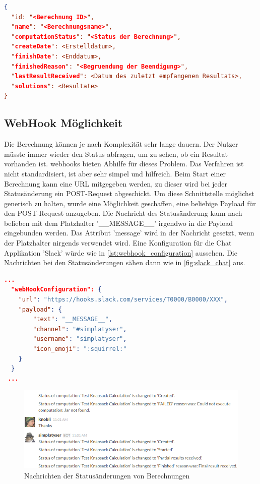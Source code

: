 \begin{lstlisting}[language=JSON, caption=Aufbau einer Antwort auf eine Statusabfrage, label=lst:status_response]  
{
  "id: "<Berechnung ID>",
  "name": "<Berechnungsname>",
  "computationStatus": "<Status der Berechnung>",
  "createDate": <Erstelldatum>,
  "finishDate": <Enddatum>,
  "finishedReason": "<Begruendung der Beendigung>",
  "lastResultReceived": <Datum des zuletzt empfangenen Resultats>,
  "solutions": <Resultate>
}
\end{lstlisting}

\subsection{WebHook Möglichkeit}
Die Berechnung können je nach Komplexität sehr lange dauern. Der Nutzer müsste immer wieder den Status abfragen, um zu sehen, ob ein Resultat vorhanden ist. \glspl{webhook} 
bieten Abhilfe für dieses Problem. Das Verfahren ist nicht standardisiert, ist aber sehr simpel und hilfreich. Beim Start einer Berechnung kann eine URL mitgegeben werden, zu dieser 
wird bei jeder Statusänderung ein POST-Request abgeschickt. Um diese Schnittstelle möglichst generisch zu halten, wurde eine Möglichkeit geschaffen, eine beliebige Payload für den 
POST-Request anzugeben. Die Nachricht des Statusänderung kann nach belieben mit dem Platzhalter '\_\_MESSAGE\_\_' irgendwo in die Payload eingebunden werden. Das Attribut 'message' 
wird in der Nachricht gesetzt, wenn der Platzhalter nirgends verwendet wird. Eine Konfiguration für die Chat Applikation 'Slack' würde wie in \autoref{lst:webhook_configuration} 
aussehen. Die Nachrichten bei den Statusänderungen sähen dann wie in \autoref{fig:slack_chat} aus.

\begin{lstlisting}[language=JSON, caption=Beispiel einer WebHook Konfiguration für Slack, label=lst:webhook_configuration]
  ...  
  "webHookConfiguration": {
    "url": "https://hooks.slack.com/services/T0000/B0000/XXX",
    "payload": {
        "text": "__MESSAGE__",
        "channel": "#simplatyser",
        "username": "simplatyser",
        "icon_emoji": ":squirrel:"
    }
  }
 ...
\end{lstlisting}

\begin{figure}[h]
\centering
\includegraphics[scale=0.8]{images/slack_chat.png}
\caption[Nachrichten der Statusänderungen von Berechnungen]{Nachrichten der Statusänderungen von Berechnungen \selfmade{}}
\label{fig:slack_chat}
\end{figure}

